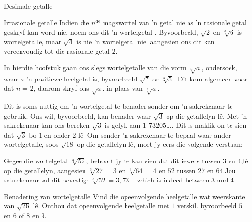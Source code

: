 \begin{Aktiwiteit}{Desimale getalle}
\begin{aktiwiteit}{Irrasionale getalle}
Indien die ${n}^{\mathrm{de}}$ magswortel van ’n getal nie as ’n rasionale getal geskryf kan word nie,  noem ons dit ’n wortelgetal . Byvoorbeeld, $\sqrt{2}$ en $\sqrt[3]{6}$ is wortelgetalle, maar $\sqrt{4}$ is nie ’n wortelgetal nie, aangesien ons dit kan vereenvoudig tot die rasionale getal $2$.\par 
In hierdie hoofstuk gaan ons slegs wortelgetalle van die vorm $\sqrt[n]{a}$, ondersoek, waar  $a$ ’n positiewe heelgetal is, byvoorbeeld $\sqrt{7}$ or $\sqrt[3]{5}$. Dit kom algemeen voor dat $n$ = $2$, daarom skryf ons $\sqrt{a}$. in plaas van $\sqrt[2]{a}$.\par 
Dit is soms nuttig om ’n wortelgetal te benader sonder om ’n sakrekenaar te gebruik. Ons wil, byvoorbeeld, kan benader waar $\sqrt{3}$ op die getallelyn lê. Met ’n sakrekenaar kan ons bereken $\sqrt{3}$ is gelyk aan $1,73205\ldots$. Dit is maklik on te sien dat $\sqrt{3}$ bo $1$ en onder $2$ lê. Om sonder ’n sakrekenaar te bepaal waar ander wortelgetalle, soos $\sqrt{18}$ op die getallelyn lê, moet jy eers die volgende verstaan:\par 


\par
       



Gegee die wortelgetal $\sqrt[3]{52}$, behoort jy te kan sien dat dit iewers tussen $3$ en $4$,lê op die getallelyn, aangesien $\sqrt[3]{27}=3$ en $\sqrt[3]{64}=4$ en $52$ tussen $27$ en $64$.Jou sakrekenaar sal dit bevestig: $\sqrt[3]{52}=3,73\ldots$ which is indeed between $3$ and $4$.\par 

\begin{wex}{Benadering van wortelgetalle}
{
Vind die opeenvolgende heelgetalle wat weerskante van $\sqrt{26}$ lê.
Onthou dat opeenvolgende heelgetalle met $1$ verskil. byvoorbeeld $5$ en $6$ of $8$ en $9$.
}
{
           
}
\end{wex}
\end{aktiwiteit}
\end{Aktiwiteit}
